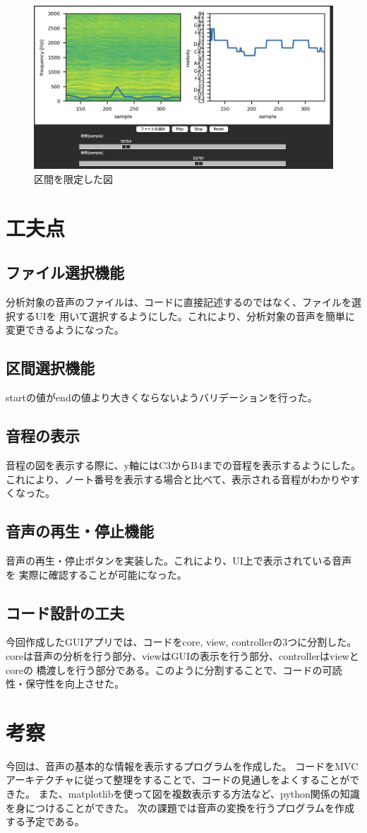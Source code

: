 \documentclass[a4paper,11pt]{jsarticle}
\begin{document}
\begin{figure}[h]
\centering
\includegraphics[keepaspectratio, width=13cm]
{./images/filtered_figures.jpg}
\caption{区間を限定した図}
\label{fig:filtered_figures}
\end{figure}

\section{工夫点}
\subsection{ファイル選択機能}
分析対象の音声のファイルは、コードに直接記述するのではなく、ファイルを選択するUIを
用いて選択するようにした。これにより、分析対象の音声を簡単に変更できるようになった。

\subsection{区間選択機能}
startの値がendの値より大きくならないようバリデーションを行った。

\subsection{音程の表示}
音程の図を表示する際に、y軸にはC3からB4までの音程を表示するようにした。
これにより、ノート番号を表示する場合と比べて、表示される音程がわかりやすくなった。

\subsection{音声の再生・停止機能}
音声の再生・停止ボタンを実装した。これにより、UI上で表示されている音声を
実際に確認することが可能になった。

\subsection{コード設計の工夫}
今回作成したGUIアプリでは、コードをcore, view, controllerの3つに分割した。
coreは音声の分析を行う部分、viewはGUIの表示を行う部分、controllerはviewとcoreの
橋渡しを行う部分である。このように分割することで、コードの可読性・保守性を向上させた。

\section{考察}
今回は、音声の基本的な情報を表示するプログラムを作成した。
コードをMVCアーキテクチャに従って整理をすることで、コードの見通しをよくすることができた。
また、matplotlibを使って図を複数表示する方法など、python関係の知識を身につけることができた。
次の課題では音声の変換を行うプログラムを作成する予定である。

\end{document}
